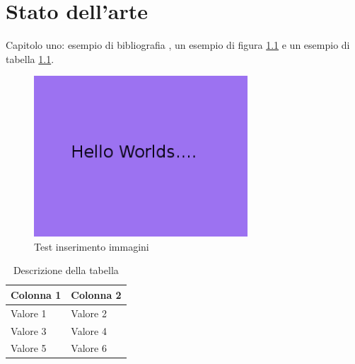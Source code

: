 \chapter{Stato dell'arte}
\label{stato dell'arte}


Capitolo uno: 
esempio di bibliografia \cite{2015arXiv150200046K}, un esempio di figura \ref{figure:test inserimento} e un esempio di tabella \ref{table:esempio_tabella}.

\begin{figure}
	\centering
	\includegraphics[width=8cm]{images/example.png}
	\caption{Test inserimento immagini}
	\label{figure:test inserimento}
\end{figure}

\begin{table}[!htbp]
	\centering
	\begin{tabular}{l|l}
		\toprule
		Colonna 1 & Colonna 2 \\
		\midrule
		Valore 1 & Valore 2 \\
		Valore 3 & Valore 4 \\
		Valore 5 & Valore 6 \\
		\bottomrule
	\end{tabular}
	\caption{Descrizione della tabella}
	\label{table:esempio_tabella}
\end{table}